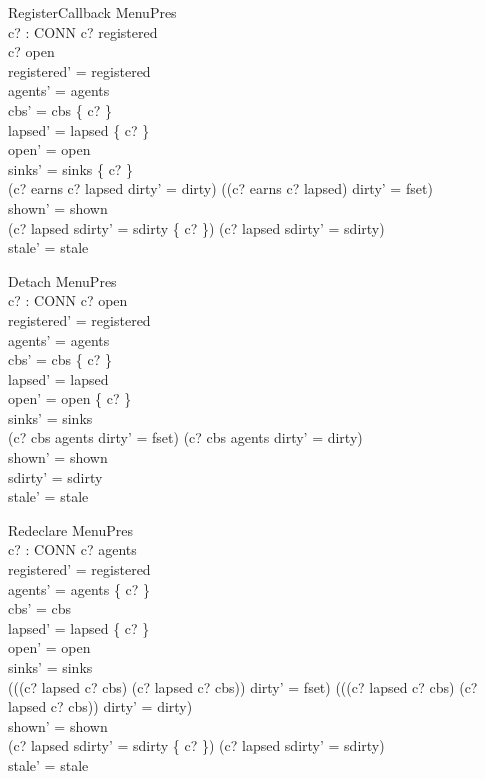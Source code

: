 \documentclass[a4paper,10pt,fleqn]{article}
\begin{document}
\begin{schema}{RegisterCallback}
  \Delta MenuPres \\
  c? : CONN
\where
  c? \in registered \\
  c? \in open \\
  registered' = registered \\
  agents' = agents \\
  cbs' = cbs \cup \{ c? \} \\
  lapsed' = lapsed \setminus \{ c? \} \\
  open' = open \\
  sinks' = sinks \oplus \{ c?  \} \\
  (c? \in earns \land c? \notin lapsed \land dirty' = dirty) \lor
    ((c? \notin earns \lor c? \in lapsed) \land dirty' = fset) \\
  shown' = shown \\
  (c? \in lapsed \land sdirty' = sdirty \cup \{ c? \}) \lor
    (c? \notin lapsed \land sdirty' = sdirty) \\
  stale' = stale
\end{schema}

\begin{schema}{Detach}
  \Delta MenuPres \\
  c? : CONN
\where
  c? \in open \\
  registered' = registered \\
  agents' = agents \\
  cbs' = cbs \setminus \{ c? \} \\
  lapsed' = lapsed \\
  open' = open \setminus \{ c? \} \\
  sinks' = sinks \\
  (c? \in cbs \setminus agents \land dirty' = fset) \lor
    (c? \notin cbs \setminus agents \land dirty' = dirty) \\
  shown' = shown \\
  sdirty' = sdirty \\
  stale' = stale
\end{schema}

\begin{schema}{Redeclare}
  \Delta MenuPres \\
  c? : CONN
\where
  c? \in agents \\
  registered' = registered \\
  agents' = agents \setminus \{ c? \} \\
  cbs' = cbs \\
  lapsed' = lapsed \setminus \{ c? \} \\
  open' = open \\
  sinks' = sinks \\
  (((c? \notin lapsed \land c? \notin cbs) \lor (c? \in lapsed \land c? \in cbs))
    \land dirty' = fset) \lor
    (\lnot ((c? \notin lapsed \land c? \notin cbs) \lor (c? \in lapsed \land c? \in cbs))
    \land dirty' = dirty) \\
  shown' = shown \\
  (c? \in lapsed \land sdirty' = sdirty \cup \{ c? \}) \lor
    (c? \notin lapsed \land sdirty' = sdirty) \\
  stale' = stale
\end{schema}
\end{document}
